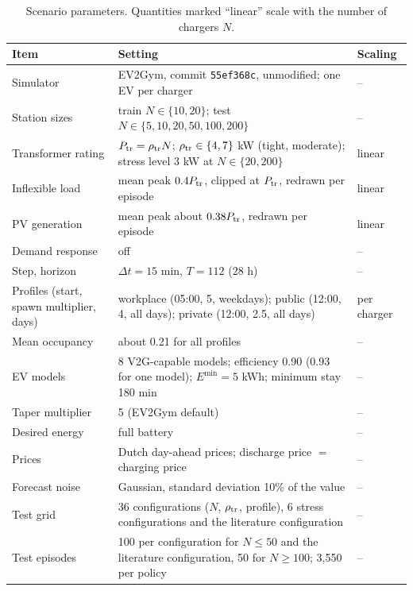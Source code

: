 \begin{table}[t]
\centering
\caption{Scenario parameters. Quantities marked ``linear'' scale with the number of chargers $N$.}
\label{tab:scenarios}
\footnotesize
\setlength{\tabcolsep}{4pt}
\begin{tabular}{@{}>{\raggedright}p{3.4cm}>{\raggedright}p{10.0cm}l@{}}
\toprule
Item & Setting & Scaling \\
\midrule
Simulator & EV2Gym, commit \texttt{55ef368c}, unmodified; one EV per charger & -- \\
Station sizes & train $N\in\{10,20\}$; test $N\in\{5,10,20,50,100,200\}$ & -- \\
Transformer rating & $P_{\mathrm{tr}}=\rho_{\mathrm{tr}}N$; $\rho_{\mathrm{tr}}\in\{4,7\}$ kW (tight, moderate); stress level 3 kW at $N\in\{20,200\}$ & linear \\
Inflexible load & mean peak $0.4P_{\mathrm{tr}}$, clipped at $P_{\mathrm{tr}}$, redrawn per episode & linear \\
PV generation & mean peak about $0.38P_{\mathrm{tr}}$, redrawn per episode & linear \\
Demand response & off & -- \\
Step, horizon & $\Delta t=15$ min, $T=112$ (28 h) & -- \\
Profiles (start, spawn multiplier, days) & workplace (05:00, 5, weekdays); public (12:00, 4, all days); private (12:00, 2.5, all days) & per charger \\
Mean occupancy & about 0.21 for all profiles & -- \\
EV models & 8 V2G-capable models; efficiency 0.90 (0.93 for one model); $E^{\min}=5$ kWh; minimum stay 180 min & -- \\
Taper multiplier & 5 (EV2Gym default) & -- \\
Desired energy & full battery & -- \\
Prices & Dutch day-ahead prices; discharge price $=$ charging price & -- \\
Forecast noise & Gaussian, standard deviation 10\% of the value & -- \\
Test grid & 36 configurations ($N$, $\rho_{\mathrm{tr}}$, profile), 6 stress configurations and the literature configuration & -- \\
Test episodes & 100 per configuration for $N\le50$ and the literature configuration, 50 for $N\ge100$; 3,550 per policy & -- \\
\bottomrule
\end{tabular}
\end{table}

